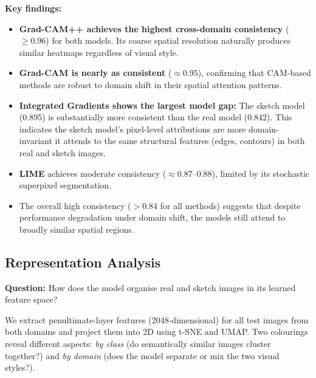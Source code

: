 \documentclass[12pt, a4paper]{article}
\begin{document}
\textbf{Key findings:}
\begin{itemize}[leftmargin=*]
    \item \textbf{Grad-CAM++ achieves the highest cross-domain consistency}
          ($\geq 0.96$) for both models.  Its coarse spatial resolution
          naturally produces similar heatmaps regardless of visual style.
    \item \textbf{Grad-CAM is nearly as consistent} ($\approx 0.95$),
          confirming that CAM-based methods are robust to domain shift in
          their spatial attention patterns.
    \item \textbf{Integrated Gradients shows the largest model gap:} The
          sketch model (0.895) is substantially more consistent than the real
          model (0.842).  This indicates the sketch model's pixel-level
          attributions are more domain-invariant it attends to the same
          structural features (edges, contours) in both real and sketch images.
    \item \textbf{LIME} achieves moderate consistency ($\approx 0.87$--$0.88$),
          limited by its stochastic superpixel segmentation.
    \item The overall high consistency ($>$0.84 for all methods) suggests that
          despite performance degradation under domain shift, the models still
          attend to broadly similar spatial regions.
\end{itemize}


\subsection{Representation Analysis}
\label{sec:representations}

\textbf{Question:} How does the model organise real and sketch images in its
learned feature space?

We extract penultimate-layer features (2048-dimensional) for all test images
from both domains and project them into 2D using t-SNE and UMAP.  Two
colourings reveal different aspects: \emph{by class} (do semantically similar
images cluster together?) and \emph{by domain} (does the model separate or
mix the two visual styles?).
\end{document}
